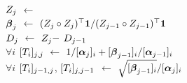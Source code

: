 \begin{algorithm2e}[p!]
{      \\
      {\color{\colormat} }
      {\color{\colormat} $Z_{j}$ $\gets$ }
      \\
      {\color{\colormat} $\boldsymbol{\beta}_j$ $\gets$ ${( Z_{j} \circ Z_{j} )^\top \mathbf 1}/{( Z_{j-1} \circ Z_{j-1} )^\top \mathbf 1}$}
      \\
      {\color{\colormat} $D_{j}$ $\gets$ $Z_{j} -$  $D_{j-1}$}
      \\
      {\color{\colornew} $\forall i$ \: $[T_{i}]_{j,j}$ $\gets$ $1/[\boldsymbol{\alpha}_{j}]_{i} + [\boldsymbol{\beta}_{j-1}]_{i}/[\boldsymbol{\alpha}_{j-1}]_{i}$}
      \\
      {\color{\colornew} $\forall i$ \: $[T_{i}]_{j-1,j}$, $[T_{i}]_{j,j-1}$ $\gets$ $\sqrt{[\boldsymbol{\beta}_{j-1}]_{i}}/[\boldsymbol{\alpha}_{j}]_{i}$}
    }
\end{algorithm2e}
